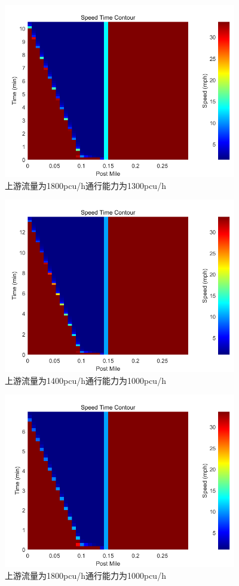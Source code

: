 \documentclass[UTF8,12.05pt]{ctexart}
\begin{document}
\begin{figure}[H]
  \centering
  \includegraphics[width=4.00in]{13001800.png}
  \caption{上游流量为1800pcu/h通行能力为1300pcu/h}
\end{figure}
\begin{figure}[H]
  \centering
  \includegraphics[width=4.00in]{10001400.png}
  \caption{上游流量为1400pcu/h通行能力为1000pcu/h}
\end{figure}
\begin{figure}[H]
  \centering
  \includegraphics[width=4.00in]{10001800.png}
  \caption{上游流量为1800pcu/h通行能力为1000pcu/h}
\end{figure}
\end{document}
